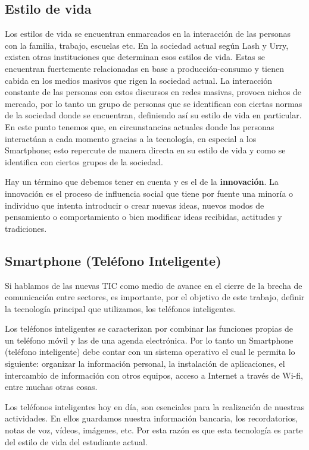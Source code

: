 	\subsection{Estilo de vida}
	Los estilos de vida se encuentran enmarcados en la interacción de las personas con la familia, trabajo, escuelas etc. En la sociedad actual según Lash y Urry, existen otras instituciones que determinan esos estilos de vida. \cite{03} Estas se encuentran fuertemente relacionadas en base a producción-consumo y tienen cabida en los medios masivos que rigen la sociedad actual. La interacción constante de las personas con estos discursos en redes masivas, provoca nichos de mercado, por lo tanto un grupo de personas que se identifican con ciertas normas de la sociedad donde se encuentran, definiendo así su estilo de vida en particular. En este punto tenemos que, en circunstancias actuales donde las personas interactúan a cada momento gracias a la tecnología, en especial a los Smartphone; esto repercute de manera directa en su estilo de vida y como se identifica con ciertos grupos de la sociedad. 
	
	Hay un término que debemos tener en cuenta y es el de la \textbf{innovación}. La innovación  es el proceso de influencia social que tiene por fuente una minoría o individuo que intenta introducir o crear nuevas ideas, nuevos modos de pensamiento o comportamiento o bien modificar ideas recibidas, actitudes y tradiciones. \cite{04}
	 
	\subsection{Smartphone (Teléfono Inteligente)}
	Si hablamos de las nuevas TIC como medio de avance en el cierre de la brecha de comunicación entre sectores, es importante,  por el objetivo de este trabajo, definir la tecnología principal que utilizamos, los teléfonos inteligentes.
	
	Los teléfonos inteligentes se caracterizan por combinar las funciones propias de un teléfono móvil y las de una agenda electrónica. Por lo tanto un Smartphone (teléfono inteligente) debe contar con un sistema operativo el cual le permita lo siguiente:
	organizar la información personal, la instalación de aplicaciones, el intercambio de información con otros equipos, acceso a Internet a través de Wi-fi, entre muchas otras cosas. \cite{05}
	
	Los teléfonos inteligentes hoy en día, son esenciales para la realización de nuestras actividades. En ellos guardamos nuestra información bancaria, los recordatorios, notas de voz, vídeos, imágenes, etc. Por esta razón es que esta tecnología es parte del estilo de vida del estudiante actual.


